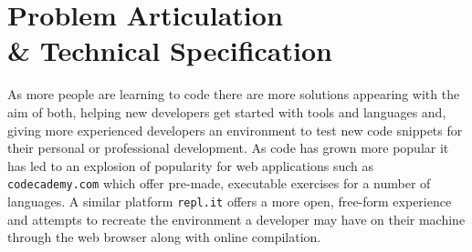 \chapter{Problem Articulation\\ \& Technical Specification} \label{chapter:probart}
As more people are learning to code there are more solutions appearing with the aim of both, helping new developers get started with tools and languages and, giving more experienced developers an environment to test new code snippets for their personal or professional development. As code has grown more popular it has led to an explosion of popularity for web applications such as \texttt{codecademy.com} which offer pre-made, executable exercises for a number of languages. A similar platform \texttt{repl.it} offers a more open, free-form experience and attempts to recreate the environment a developer may have on their machine through the web browser along with online compilation.

